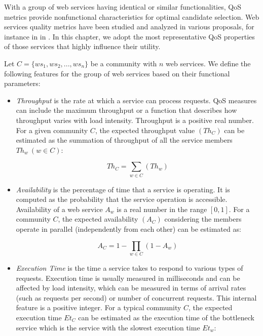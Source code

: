 With a group of web services having identical or similar functionalities, QoS metrics provide nonfunctional characteristics for optimal candidate selection. Web services quality metrics have been studied and analyzed in various proposals, for instance in in \cite{Ardagna:2007:ASC:1263152.1263531,Menasce:2002:QIW:613357.613758,10.1109/ISSRE.2011.17}. In this chapter, we adopt the most representative QoS properties of those services that highly influence their utility.

Let $C = \{ws_1,ws_2,..., ws_n\}$ be a community with $n$ web services. We define the following features for the group of web services based on their functional parameters:

\begin{itemize}

  \item \emph{Throughput} is the rate at which a service can process requests. QoS measures can include the maximum throughput or a function that describes how throughput varies with load intensity. Throughput is a positive real number. For a given community $C$, the expected throughput value $(Th_{C})$ can be estimated as the summation of throughput of all the service members $Th_{w}~ (w \in C)$:
	
	\begin{equation}
		 Th_{C} = \sum_{w \in C}{(Th_{w})}
	\end{equation}
	
	\item \emph{Availability} is the percentage of time that a service is operating. It is computed as
the probability that the service operation is accessible. Availability of a web service $A_w$ is a real number in the range $[0, 1]$. For a community $C$, the expected availability $(A_{C})$ considering the members operate in parallel (independently from each other) can be estimated as:
	
	\begin{equation}
		A_{C} = 1-\prod_{w \in C}{(1-A_{w})}
	\end{equation}
	
	\item \emph{Execution Time} is the time a service takes to respond to various types of requests.
	Execution time is usually measured in milliseconds and can be affected by load intensity, which can be measured in terms of arrival rates (such as requests per second) or number of concurrent requests. This internal feature is a positive integer. For a typical community $C$, the expected execution time $Et_{C}$ can be estimated as the execution time of the bottleneck service which is the service with the slowest execution time $Et_{w}$:
	

\end{itemize}

